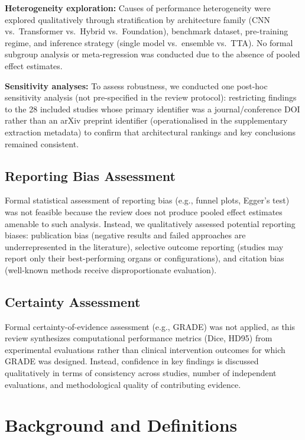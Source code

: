 \documentclass[conference]{IEEEtran}
\begin{document}
\textbf{Heterogeneity exploration:} Causes of performance heterogeneity were explored qualitatively through stratification by architecture family (CNN vs.\ Transformer vs.\ Hybrid vs.\ Foundation), benchmark dataset, pre-training regime, and inference strategy (single model vs.\ ensemble vs.\ TTA). No formal subgroup analysis or meta-regression was conducted due to the absence of pooled effect estimates.

\textbf{Sensitivity analyses:} To assess robustness, we conducted one post-hoc sensitivity analysis (not pre-specified in the review protocol): restricting findings to the 28 included studies whose primary identifier was a journal/conference DOI rather than an arXiv preprint identifier (operationalised in the supplementary extraction metadata) to confirm that architectural rankings and key conclusions remained consistent.

\subsection{Reporting Bias Assessment}

Formal statistical assessment of reporting bias (e.g., funnel plots, Egger's test) was not feasible because the review does not produce pooled effect estimates amenable to such analysis. Instead, we qualitatively assessed potential reporting biases: publication bias (negative results and failed approaches are underrepresented in the literature), selective outcome reporting (studies may report only their best-performing organs or configurations), and citation bias (well-known methods receive disproportionate evaluation).

\subsection{Certainty Assessment}

Formal certainty-of-evidence assessment (e.g., GRADE) was not applied, as this review synthesizes computational performance metrics (Dice, HD95) from experimental evaluations rather than clinical intervention outcomes for which GRADE was designed. Instead, confidence in key findings is discussed qualitatively in terms of consistency across studies, number of independent evaluations, and methodological quality of contributing evidence.

\section{Background and Definitions}
\label{sec:background}
\end{document}
